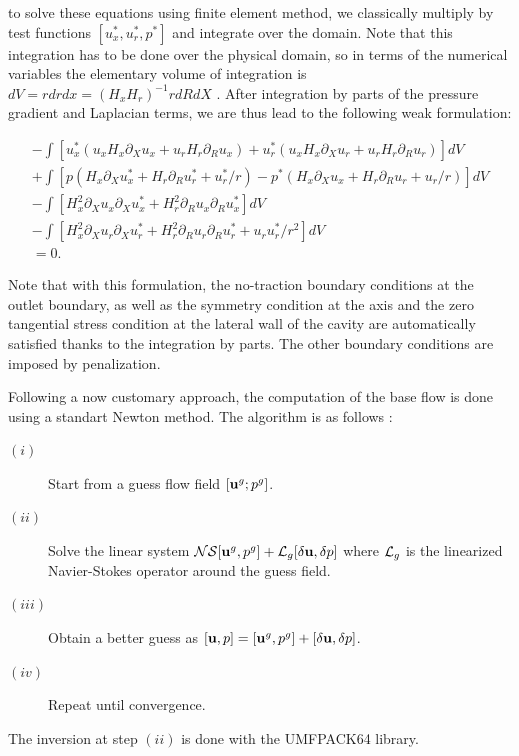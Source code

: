 \documentclass{jfm}
\newcommand\be{\begin{equation}}
\newcommand\ee{\end{equation}}
\begin{document}
to solve these equations using finite element method, we classically multiply by test functions 
$[u_x^*, u_r^*,p^*]$ and integrate over the domain. Note that this integration has to be done over the physical domain, so in terms of the numerical variables the elementary volume of integration is $dV = r dr dx = (H_x H_r)^{-1} r dR dX$ .
After integration by parts of the pressure gradient and Laplacian terms, we are thus lead to the following weak formulation: 

\be
\begin{array}{l}
\displaystyle
- \int \left[ 
u_x^* \left( u_x  H_x \partial_X u_x + u_r H_r \partial_R u_x \right) 
+ u_r^* \left( u_x  H_x \partial_X u_r + u_r H_r \partial_R u_r \right) 
\right] dV
\\
\displaystyle
+ \int \left[ 
p \left( H_x \partial_X u_x^* + H_r \partial_R u_r^* + u_r^*/r \right) 
-
p^* \left( H_x \partial_X u_x + H_r \partial_R u_r + u_r/r \right) 
\right] dV
\\
\displaystyle
- \int \left[ 
H_x^2 \partial_X u_x \partial_X u_x^* +H_r^2 \partial_R u_x \partial_R u_x^*
\right] dV
\\
\displaystyle
- \int \left[ 
H_x^2 \partial_X u_r \partial_X u_r^* +H_r^2 \partial_R u_r \partial_R u_r^*
+ u_r u_r^*/r^2
\right] dV
\\
= 0.
\end{array}
\ee






Note that with this formulation, the no-traction boundary conditions at the outlet boundary, as well as the symmetry condition at the axis and the zero tangential stress condition at the lateral wall of the cavity are automatically satisfied thanks to the integration by parts. The other boundary conditions are imposed by penalization.

Following a now customary approach, the computation of the base flow is done using a standart Newton method. The algorithm is as follows :
\begin{description}
\item[$(i)$] Start from a guess flow field $[{\bf u}^g;p^g]$.
\item[$(ii)$] Solve the linear system ${\cal NS}[{\bf u}^g,p^g] + {\cal L}_g [\delta {\bf u}, \delta p]$ where $ {\cal L}_g$ is the linearized Navier-Stokes operator around the guess field.
\item[$(iii)$] Obtain a better guess as $ [{\bf u},p] = [{\bf u}^g,p^g] +  [\delta {\bf u}, \delta p]$.
\item[$(iv)$] Repeat until convergence.
\end{description}
The inversion at step $(ii)$ is done with the UMFPACK64 library.
\end{document}
